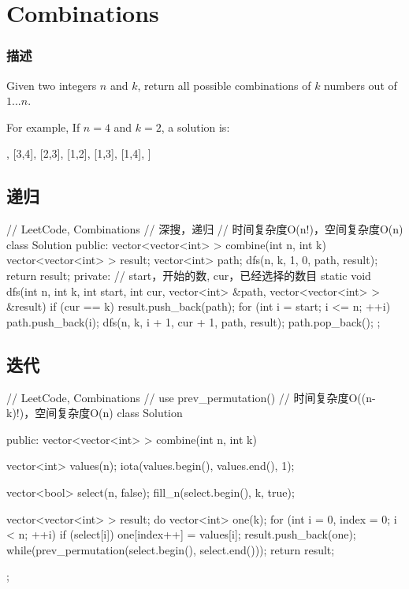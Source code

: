 \section{Combinations} %
\label{sec:combinations}


\subsubsection{描述}
Given two integers $n$ and $k$, return all possible combinations of $k$ numbers out of $1 ... n$.

For example,
If $n = 4$ and $k = 2$, a solution is:
\begin{Code}
[
  [2,4],
  [3,4],
  [2,3],
  [1,2],
  [1,3],
  [1,4],
]
\end{Code}


\subsection{递归}
\begin{Code}
// LeetCode, Combinations
// 深搜，递归
// 时间复杂度O(n!)，空间复杂度O(n)
class Solution {
public:
    vector<vector<int> > combine(int n, int k) {
        vector<vector<int> > result;
        vector<int> path;
        dfs(n, k, 1, 0, path, result);
        return result;
    }
private:
    // start，开始的数, cur，已经选择的数目
    static void dfs(int n, int k, int start, int cur,
            vector<int> &path, vector<vector<int> > &result) {
        if (cur == k) {
            result.push_back(path);
        }
        for (int i = start; i <= n; ++i) {
            path.push_back(i);
            dfs(n, k, i + 1, cur + 1, path, result);
            path.pop_back();
        }
    }
};
\end{Code}


\subsection{迭代}
\begin{Code}
// LeetCode, Combinations
// use prev_permutation()
// 时间复杂度O((n-k)!)，空间复杂度O(n)
class Solution {
public:
    vector<vector<int> > combine(int n, int k) {
        vector<int> values(n);
        iota(values.begin(), values.end(), 1);

        vector<bool> select(n, false);
        fill_n(select.begin(), k, true);

        vector<vector<int> > result;
        do{
            vector<int> one(k);
            for (int i = 0, index = 0; i < n; ++i)
                if (select[i])
                    one[index++] = values[i];
            result.push_back(one);
        } while(prev_permutation(select.begin(), select.end()));
        return result;
    }
};
\end{Code}


